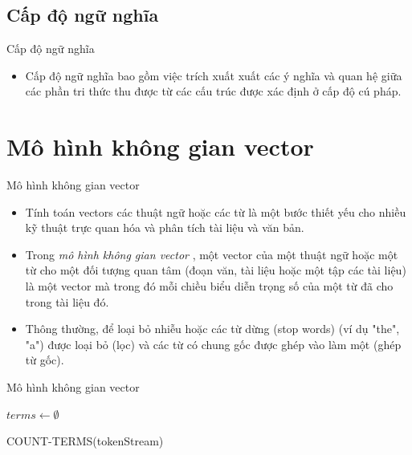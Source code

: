 \documentclass[10pt]{beamer}
\theoremstyle{remark}
\theoremstyle{definition}
\begin{document}
\subsection{Cấp độ ngữ nghĩa}

\begin{frame}{Cấp độ ngữ nghĩa}
	\begin{itemize}
		\item Cấp độ ngữ nghĩa bao gồm việc trích xuất xuất các ý nghĩa và quan hệ giữa các phần tri thức thu được từ các cấu trúc được xác định ở cấp độ cú pháp.
	\end{itemize}
\end{frame}

\section{Mô hình không gian vector}

\begin{frame}{Mô hình không gian vector}
	\begin{itemize}
		\item  Tính toán vectors các thuật ngữ hoặc các từ là một bước thiết yếu cho nhiều kỹ thuật trực quan hóa và phân tích tài liệu và văn bản.
		\item Trong \textit{mô hình không gian vector} \cite{356}, một vector của một thuật ngữ hoặc một từ cho một đối tượng quan tâm (đoạn văn, tài liệu hoặc một tập các tài liệu) là một vector mà trong đó mỗi chiều biểu diễn trọng số của một từ đã cho trong tài liệu đó.
		\item Thông thường, để loại bỏ nhiễu hoặc các từ dừng (stop words) (ví dụ "the", "a") được loại bỏ (lọc) và các từ có chung gốc được ghép vào làm một (ghép từ gốc).
	\end{itemize}
\end{frame}


\begin{frame}{Mô hình không gian vector}
	\begin{algorithm}[H]
        \DontPrintSemicolon
        $terms \gets \emptyset$\;
        \;
        \caption{COUNT-TERMS(tokenStream)}
        \label{alg:COUNT-TERMS}
    \end{algorithm}
\end{frame}
\end{document}
